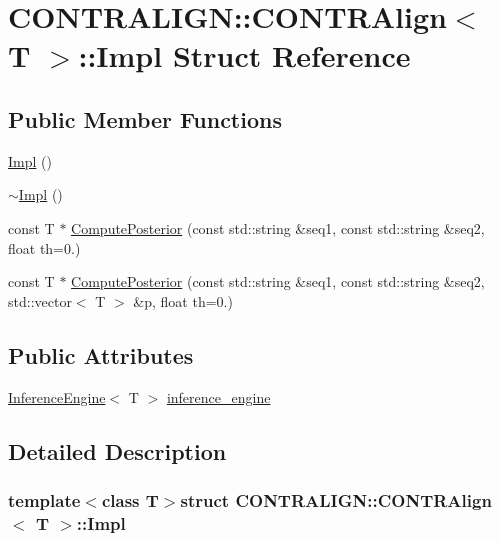 \hypertarget{struct_c_o_n_t_r_a_l_i_g_n_1_1_c_o_n_t_r_align_1_1_impl}{\section{C\+O\+N\+T\+R\+A\+L\+I\+G\+N\+:\+:C\+O\+N\+T\+R\+Align$<$ T $>$\+:\+:Impl Struct Reference}
\label{struct_c_o_n_t_r_a_l_i_g_n_1_1_c_o_n_t_r_align_1_1_impl}
}
\subsection*{Public Member Functions}
\begin{DoxyCompactItemize}
\item 
\hyperlink{struct_c_o_n_t_r_a_l_i_g_n_1_1_c_o_n_t_r_align_1_1_impl_a3217b0ecb467f9bc214ce6ae7989ae4c}{Impl} ()
\item 
\hyperlink{struct_c_o_n_t_r_a_l_i_g_n_1_1_c_o_n_t_r_align_1_1_impl_a8aa25d9f5587f24b14b44211a0846818}{$\sim$\+Impl} ()
\item 
const T $\ast$ \hyperlink{struct_c_o_n_t_r_a_l_i_g_n_1_1_c_o_n_t_r_align_1_1_impl_a44d5076d9c20bf23dab4ce3285c7afce}{Compute\+Posterior} (const std\+::string \&seq1, const std\+::string \&seq2, float th=0.)
\item 
const T $\ast$ \hyperlink{struct_c_o_n_t_r_a_l_i_g_n_1_1_c_o_n_t_r_align_1_1_impl_a6f4b1346516af707b7b9a4d77956ec47}{Compute\+Posterior} (const std\+::string \&seq1, const std\+::string \&seq2, std\+::vector$<$ T $>$ \&p, float th=0.)
\end{DoxyCompactItemize}
\subsection*{Public Attributes}
\begin{DoxyCompactItemize}
\item 
\hyperlink{class_c_o_n_t_r_a_l_i_g_n_1_1_inference_engine}{Inference\+Engine}$<$ T $>$ \hyperlink{struct_c_o_n_t_r_a_l_i_g_n_1_1_c_o_n_t_r_align_1_1_impl_a57c43c920a6541fd5c37c78bed27881a}{inference\+\_\+engine}
\end{DoxyCompactItemize}


\subsection{Detailed Description}
\subsubsection*{template$<$class T$>$struct C\+O\+N\+T\+R\+A\+L\+I\+G\+N\+::\+C\+O\+N\+T\+R\+Align$<$ T $>$\+::\+Impl}



